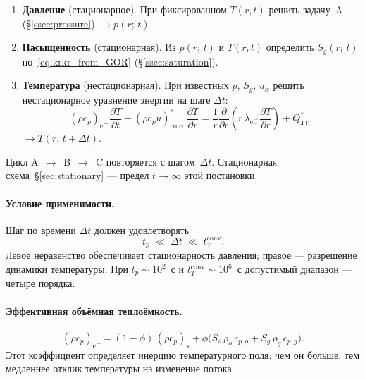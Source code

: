 ﻿\documentclass[12pt,a4paper]{article}
\begin{document}
\begin{enumerate}[label=\textbf{\Alph*.}, nosep, leftmargin=*]
  \item \textbf{Давление} (стационарное).
        При фиксированном $T(r,t)$ решить
        задачу~A (\S\ref{ssec:pressure}) $\to p(r;\,t)$.
  \item \textbf{Насыщенность} (стационарная).
        Из $p(r;\,t)$ и $T(r,t)$
        определить $S_g(r;\,t)$
        по~\eqref{eq:krkr_from_GOR} (\S\ref{ssec:saturation}).
  \item \textbf{Температура} (нестационарная).
        При известных $p$, $S_g$, $u_\alpha$
        решить нестационарное уравнение энергии
        на шаге $\Delta t$:
        \begin{equation}\label{eq:energy_nonstat}
          (\rho c_p)_{\mathrm{eff}}\,\frac{\partial T}{\partial t}
          + (\rho c_p u)_{\mathrm{conv}}^*\,\frac{\partial T}{\partial r}
          = \frac{1}{r}\frac{\partial}{\partial r}\!\left(
            r\,\lambda_{\mathrm{eff}}\,\frac{\partial T}{\partial r}\right)
          + Q_{\mathrm{JT}}^*,
        \end{equation}
        $\to T(r,\,t+\Delta t)$.
\end{enumerate}
Цикл A~$\to$~B~$\to$~C повторяется с шагом~$\Delta t$.
Стационарная схема~\S\ref{sec:stationary} --- предел
$t \to \infty$ этой постановки.

\paragraph{Условие применимости.}
Шаг по времени $\Delta t$ должен удовлетворять
\begin{equation}\label{eq:dt_condition}
  t_p \;\ll\; \Delta t \;\ll\; t_T^{\mathrm{conv}}.
\end{equation}
Левое неравенство обеспечивает стационарность
давления; правое --- разрешение динамики
температуры. При $t_p \sim 10^2$~с
и $t_T^{\mathrm{conv}} \sim 10^6$~с
допустимый диапазон --- четыре порядка.

\paragraph{Эффективная объёмная теплоёмкость.}
\begin{equation}\label{eq:rhocp_eff}
  (\rho c_p)_{\mathrm{eff}}
  = (1 - \phi)\,(\rho c_p)_s
  + \phi\bigl(S_o\,\rho_o\,c_{p,o}
    + S_g\,\rho_g\,c_{p,g}\bigr).
\end{equation}
Этот коэффициент определяет инерцию
температурного поля: чем он больше, тем медленнее
отклик температуры на изменение потока.
\end{document}
